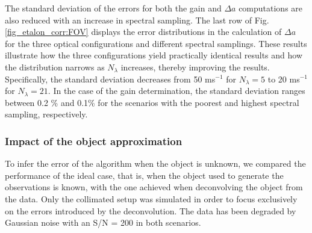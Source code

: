 The standard deviation of the errors for both the gain and $\Delta a$ computations are also reduced with an increase in spectral sampling. The last row of Fig. \ref{fig_etalon_corr:FOV} displays the error distributions in the calculation of  $\Delta a$ for the three optical configurations and different spectral samplings. These results illustrate how the three configurations yield practically identical results and how the distribution narrows as $N_\lambda$ increases, thereby improving the results. Specifically, the standard deviation decreases from 50 ms$^{-1}$ for $N_\lambda = 5$ to 20 ms$^{-1}$ for $N_\lambda = 21$. In the case of the gain determination, the standard deviation ranges between 0.2 \% and 0.1\% for the scenarios with the poorest and highest spectral sampling, respectively.

\subsubsection{Impact of the object approximation}

To infer the error of the algorithm when the object is unknown, we compared the performance of the ideal case, that is, when the object used to generate the observations is known, with the one achieved when deconvolving the object from the data. Only the collimated setup was simulated in order to focus exclusively on the errors introduced by the deconvolution. The data has been degraded by Gaussian noise with an S/N = 200 in both scenarios. 


